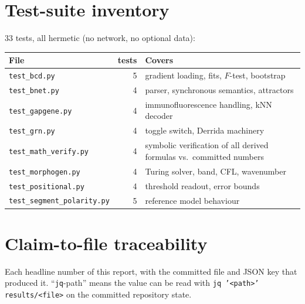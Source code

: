 \section{Test-suite inventory}
\label{app:tests}

33 tests, all hermetic (no network, no optional data):

\begin{center}
\begin{tabular}{lrl}
\toprule
File & tests & Covers \\
\midrule
\texttt{test\_bcd.py} & 5 & gradient loading, fits, $F$-test, bootstrap \\
\texttt{test\_bnet.py} & 4 & parser, synchronous semantics, attractors \\
\texttt{test\_gapgene.py} & 4 & immunofluorescence handling, kNN decoder \\
\texttt{test\_grn.py} & 4 & toggle switch, Derrida machinery \\
\texttt{test\_math\_verify.py} & 4 & symbolic verification of all derived
formulas vs.\ committed numbers \\
\texttt{test\_morphogen.py} & 4 & Turing solver, band, CFL, wavenumber \\
\texttt{test\_positional.py} & 4 & threshold readout, error bounds \\
\texttt{test\_segment\_polarity.py} & 5 & reference model behaviour \\
\bottomrule
\end{tabular}
\end{center}

\section{Claim-to-file traceability}
\label{app:trace}

Each headline number of this report, with the committed file and JSON key
that produced it. ``\texttt{jq}-path'' means the value can be read with
\texttt{jq '<path>' results/<file>} on the committed repository state.

